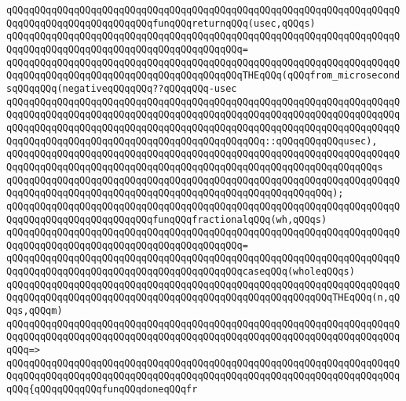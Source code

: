 \newline
\newline
\verb|qQQqqQQqqQQqqQQqqQQqqQQqqQQqqQQqqQQqqQQqqQQqqQQqqQQqqQQqqQQqqQQqqQQqqQQqqQQqqQQqqQQqqQQqqQQqqQQqfunqQQqreturnqQQq(usec,qQQqs)|\newline
\verb|qQQqqQQqqQQqqQQqqQQqqQQqqQQqqQQqqQQqqQQqqQQqqQQqqQQqqQQqqQQqqQQqqQQqqQQqqQQqqQQqqQQqqQQqqQQqqQQqqQQqqQQqqQQqqQQq=|\newline
\verb|qQQqqQQqqQQqqQQqqQQqqQQqqQQqqQQqqQQqqQQqqQQqqQQqqQQqqQQqqQQqqQQqqQQqqQQqqQQqqQQqqQQqqQQqqQQqqQQqqQQqqQQqqQQqqQQqTHEqQQq(qQQqfrom_microsecondsqQQqqQQq(negativeqQQqqQQq??qQQqqQQq-usec|\newline
\verb|qQQqqQQqqQQqqQQqqQQqqQQqqQQqqQQqqQQqqQQqqQQqqQQqqQQqqQQqqQQqqQQqqQQqqQQqqQQqqQQqqQQqqQQqqQQqqQQqqQQqqQQqqQQqqQQqqQQqqQQqqQQqqQQqqQQqqQQqqQQqqQQqqQQqqQQqqQQqqQQqqQQqqQQqqQQqqQQqqQQqqQQqqQQqqQQqqQQqqQQqqQQqqQQqqQQqqQQqqQQqqQQqqQQqqQQqqQQqqQQqqQQqqQQqqQQqqQQq::qQQqqQQqqQQqusec),|\newline
\verb|qQQqqQQqqQQqqQQqqQQqqQQqqQQqqQQqqQQqqQQqqQQqqQQqqQQqqQQqqQQqqQQqqQQqqQQqqQQqqQQqqQQqqQQqqQQqqQQqqQQqqQQqqQQqqQQqqQQqqQQqqQQqqQQqqQQqqQQqs|\newline
\verb|qQQqqQQqqQQqqQQqqQQqqQQqqQQqqQQqqQQqqQQqqQQqqQQqqQQqqQQqqQQqqQQqqQQqqQQqqQQqqQQqqQQqqQQqqQQqqQQqqQQqqQQqqQQqqQQqqQQqqQQqqQQqqQQq);|\newline
\newline
\verb|qQQqqQQqqQQqqQQqqQQqqQQqqQQqqQQqqQQqqQQqqQQqqQQqqQQqqQQqqQQqqQQqqQQqqQQqqQQqqQQqqQQqqQQqqQQqqQQqfunqQQqfractionalqQQq(wh,qQQqs)|\newline
\verb|qQQqqQQqqQQqqQQqqQQqqQQqqQQqqQQqqQQqqQQqqQQqqQQqqQQqqQQqqQQqqQQqqQQqqQQqqQQqqQQqqQQqqQQqqQQqqQQqqQQqqQQqqQQqqQQq=|\newline
\verb|qQQqqQQqqQQqqQQqqQQqqQQqqQQqqQQqqQQqqQQqqQQqqQQqqQQqqQQqqQQqqQQqqQQqqQQqqQQqqQQqqQQqqQQqqQQqqQQqqQQqqQQqqQQqqQQqcaseqQQq(wholeqQQqs)|\newline
\newline
\verb|qQQqqQQqqQQqqQQqqQQqqQQqqQQqqQQqqQQqqQQqqQQqqQQqqQQqqQQqqQQqqQQqqQQqqQQqqQQqqQQqqQQqqQQqqQQqqQQqqQQqqQQqqQQqqQQqqQQqqQQqqQQqqQQqTHEqQQq(n,qQQqs,qQQqm)|\newline
\verb|qQQqqQQqqQQqqQQqqQQqqQQqqQQqqQQqqQQqqQQqqQQqqQQqqQQqqQQqqQQqqQQqqQQqqQQqqQQqqQQqqQQqqQQqqQQqqQQqqQQqqQQqqQQqqQQqqQQqqQQqqQQqqQQqqQQqqQQqqQQqqQQq=>|\newline
\verb|qQQqqQQqqQQqqQQqqQQqqQQqqQQqqQQqqQQqqQQqqQQqqQQqqQQqqQQqqQQqqQQqqQQqqQQqqQQqqQQqqQQqqQQqqQQqqQQqqQQqqQQqqQQqqQQqqQQqqQQqqQQqqQQqqQQqqQQqqQQqqQQq{qQQqqQQqqQQqfunqQQqdoneqQQqfr|\newline
